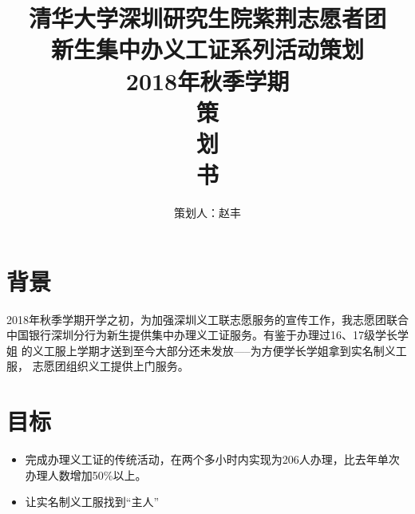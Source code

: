 \documentclass[12pt]{ctexart}
\begin{document}
\title{
    \vspace{-0.5in}
    \textmd{\textbf{\huge{清华大学深圳研究生院紫荆志愿者团\\新生集中办义工证系列活动策划}}}\\
    \normalsize\vspace{0.1in}\Large{2018年秋季学期}\\
    \vspace{1in}
     \textbf{\huge{策}}\\
    \vspace{1in}
     \textbf{\huge{划}}\\
    \vspace{1in}
     \textbf{\huge{书}}\\
    \vspace{1in}
}
\author{策划人：赵丰}
\maketitle
\thispagestyle{empty}
\pagebreak
\pagestyle{runningpage}

\section{背景}
2018年秋季学期开学之初，为加强深圳义工联志愿服务的宣传工作，我志愿团联合中国银行深圳分行为新生提供集中办理义工证服务。有鉴于办理过16、17级学长学姐
的义工服上学期才送到至今大部分还未发放-----为方便学长学姐拿到实名制义工服，
志愿团组织义工提供上门服务。
\section{目标}
\begin{itemize}
\item 完成办理义工证的传统活动，在两个多小时内实现为206人办理，比去年单次办理人数增加50\%以上。
\item 让实名制义工服找到“主人”
\end{itemize}
\end{document}
